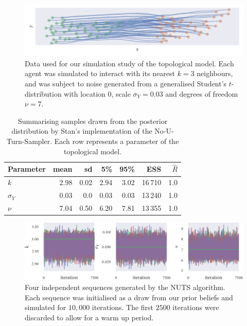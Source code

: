 \begin{figure}[tbp]
  \includegraphics{top_sim.pdf}
  \caption{Data used for our simulation study of the topological model. Each agent was
    simulated to interact with its nearest $k=3$ neighbours, and was subject to noise
    generated from a generalised Student's $t$-distribution with location $0$, scale
    $\sigma_Y=0.03$ and degrees of freedom $\nu=7$.}
  \label{fig:top_sim}
\end{figure}
\begin{table}[tbp]
  \begin{tabular}{@{}lrrrrrr@{}}
    \toprule
    Parameter    & mean & sd   & 5\%  & 95\% & ESS     & $\widehat{R}$ \\
    \midrule
    $k$          & 2.98 & 0.02 & 2.94 & 3.02 & 16\,710 & 1.0           \\
    $\sigma_{Y}$ & 0.03 & 0.0  & 0.03 & 0.03 & 13\,240 & 1.0           \\
    $\nu$        & 7.04 & 0.50 & 6.20 & 7.81 & 13\,355 & 1.0           \\
    \bottomrule
  \end{tabular}
  \caption{Summarising samples drawn from the posterior distribution by Stan's
    implementation of the No-U-Turn-Sampler. Each row represents a parameter of the
    topological model.}
  \label{tab:top_sim_study_summary}
\end{table}
\begin{figure}[tbp]
  \includegraphics{stan_top_trace.pdf}
  \caption{Four independent sequences generated by the NUTS algorithm. Each sequence was
    initialised as a draw from our prior beliefs and simulated for $10,000$ iterations.
    The first $2500$ iterations were discarded to allow for a warm up period.}
    \label{fig:top_sim_study_chains}
\end{figure}
